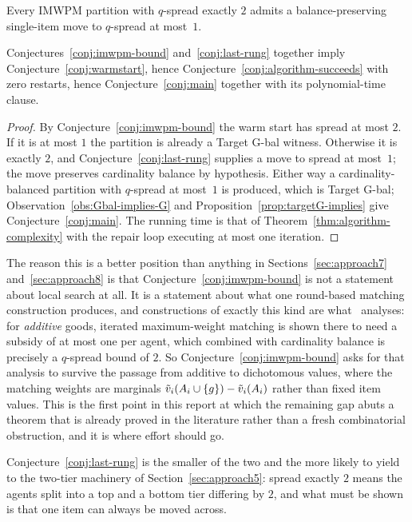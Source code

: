 \begin{conjecture}
\label{conj:last-rung}
Every IMWPM partition with $q$-spread exactly $2$ admits a balance-preserving
single-item move to $q$-spread at most~$1$.
\end{conjecture}

\begin{proposition}
\label{prop:two-claims}
Conjectures~\ref{conj:imwpm-bound} and~\ref{conj:last-rung} together imply
Conjecture~\ref{conj:warmstart}, hence
Conjecture~\ref{conj:algorithm-succeeds} with zero restarts, hence
Conjecture~\ref{conj:main} together with its polynomial-time clause.
\end{proposition}

\begin{proof}
By Conjecture~\ref{conj:imwpm-bound} the warm start has spread at most $2$. If it
is at most $1$ the partition is already a Target G-bal witness. Otherwise it is
exactly $2$, and Conjecture~\ref{conj:last-rung} supplies a move to spread at
most~$1$; the move preserves cardinality balance by hypothesis. Either way a
cardinality-balanced partition with $q$-spread at most~$1$ is produced, which is
Target G-bal; Observation~\ref{obs:Gbal-implies-G} and
Proposition~\ref{prop:targetG-implies} give Conjecture~\ref{conj:main}. The
running time is that of Theorem~\ref{thm:algorithm-complexity} with the repair
loop executing at most one iteration.
\end{proof}

The reason this is a better position than anything in
Sections~\ref{sec:approach7} and~\ref{sec:approach8} is that
Conjecture~\ref{conj:imwpm-bound} is not a statement about local search at all.
It is a statement about what one round-based matching construction produces, and
constructions of exactly this kind are what~\cite{BDNSV20} analyses: for
\emph{additive} goods, iterated maximum-weight matching is shown there to need a
subsidy of at most one per agent, which combined with cardinality balance is
precisely a $q$-spread bound of $2$. So Conjecture~\ref{conj:imwpm-bound} asks
for that analysis to survive the passage from additive to dichotomous values,
where the matching weights are marginals $\tilde v_i(A_{i} \cup \left\{g\right\}) -
\tilde v_i(A_{i})$ rather than fixed item values. This is the first point in
this report at which the remaining gap abuts a theorem that is already proved in
the literature rather than a fresh combinatorial obstruction, and it is where
effort should go.

Conjecture~\ref{conj:last-rung} is the smaller of the two and the more likely to
yield to the two-tier machinery of Section~\ref{sec:approach5}: spread exactly
$2$ means the agents split into a top and a bottom tier differing by $2$, and
what must be shown is that one item can always be moved across.


